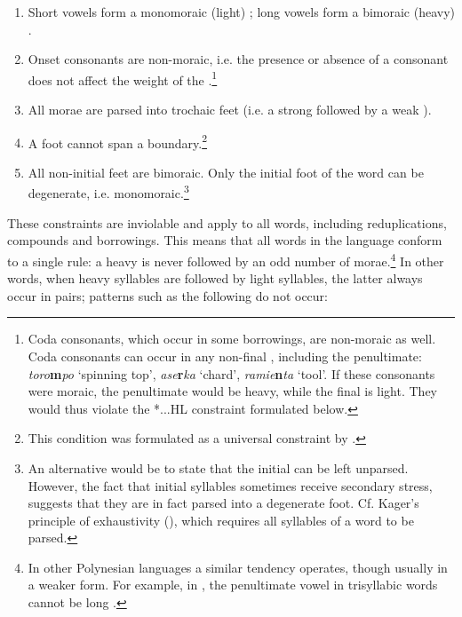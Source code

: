 \begin{enumerate}
\item 
Short vowels form a monomoraic (light) ; long vowels form a bimoraic (heavy) .

\item 
Onset consonants are non-moraic, i.e. the presence or absence of a consonant does not affect the weight of the .\footnote{\label{fn:42}Coda consonants, which occur in some borrowings, are non-moraic as well. Coda consonants can occur in any non-final , including the penultimate: \textit{toro}\textbf{m}\textit{po} ‘spinning top’, \textit{ase}\textbf{r}\textit{ka} ‘chard’, \textit{ramie}\textbf{n}\textit{ta} ‘tool’. If these consonants were moraic, the penultimate  would be heavy, while the final  is light. They would thus violate the *...HL constraint formulated below.}

\item 
All morae are parsed into trochaic feet (i.e. a strong  followed by a weak ).

\item 
A foot cannot span a  boundary.\footnote{\label{fn:43}This condition was formulated as a universal constraint by \citet[50]{Hayes1995}.} 

\item 
All non-initial feet are bimoraic. Only the initial foot of the word can be degenerate, i.e. monomoraic.\footnote{\label{fn:44}An alternative would be to state that the initial  can be left unparsed. However, the fact that initial syllables sometimes receive secondary stress, suggests that they are in fact parsed into a degenerate foot. Cf. Kager’s principle of exhaustivity (\citealt[370]{Kager1995}), which requires all syllables of a word to be parsed.} 

\end{enumerate}

These constraints are inviolable and apply to all words, including reduplications, compounds and borrowings. This means that all words in the language conform to a single rule: a heavy  is never followed by an odd number of morae.\footnote{\label{fn:45}In other Polynesian languages a similar tendency operates, though usually in a weaker form. For example, in , the penultimate vowel in trisyllabic words cannot be long \citep[102]{Hovdhaugen1990}.} In other words, when heavy syllables are followed by light syllables, the latter always occur in pairs; patterns such as the following do not occur: 

